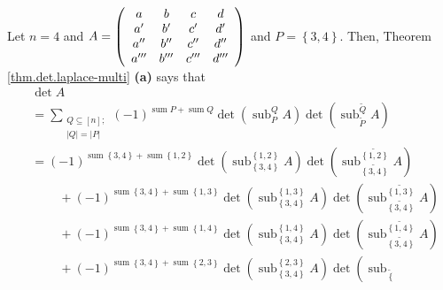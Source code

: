 \begin{example}
Let $n=4$ and $A=\left(
\begin{array}
[c]{cccc}%
a & b & c & d\\
a^{\prime} & b^{\prime} & c^{\prime} & d^{\prime}\\
a^{\prime\prime} & b^{\prime\prime} & c^{\prime\prime} & d^{\prime\prime}\\
a^{\prime\prime\prime} & b^{\prime\prime\prime} & c^{\prime\prime\prime} &
d^{\prime\prime\prime}%
\end{array}
\right)  $ and $P=\left\{  3,4\right\}  $. Then, Theorem
\ref{thm.det.laplace-multi} \textbf{(a)} says that%
\begin{align*}
&  \det A\\
&  =\sum_{\substack{Q\subseteq\left[  n\right]  ;\\\left\vert Q\right\vert
=\left\vert P\right\vert }}\left(  -1\right)  ^{\operatorname*{sum}%
P+\operatorname*{sum}Q}\det\left(  \operatorname*{sub}\nolimits_{P}%
^{Q}A\right)  \det\left(  \operatorname*{sub}\nolimits_{\widetilde{P}%
}^{\widetilde{Q}}A\right) \\
&  =\left(  -1\right)  ^{\operatorname*{sum}\left\{  3,4\right\}
+\operatorname*{sum}\left\{  1,2\right\}  }\det\left(  \operatorname*{sub}%
\nolimits_{\left\{  3,4\right\}  }^{\left\{  1,2\right\}  }A\right)
\det\left(  \operatorname*{sub}\nolimits_{\widetilde{\left\{  3,4\right\}  }%
}^{\widetilde{\left\{  1,2\right\}  }}A\right) \\
&  \ \ \ \ \ \ \ \ \ \ +\left(  -1\right)  ^{\operatorname*{sum}\left\{
3,4\right\}  +\operatorname*{sum}\left\{  1,3\right\}  }\det\left(
\operatorname*{sub}\nolimits_{\left\{  3,4\right\}  }^{\left\{  1,3\right\}
}A\right)  \det\left(  \operatorname*{sub}\nolimits_{\widetilde{\left\{
3,4\right\}  }}^{\widetilde{\left\{  1,3\right\}  }}A\right) \\
&  \ \ \ \ \ \ \ \ \ \ +\left(  -1\right)  ^{\operatorname*{sum}\left\{
3,4\right\}  +\operatorname*{sum}\left\{  1,4\right\}  }\det\left(
\operatorname*{sub}\nolimits_{\left\{  3,4\right\}  }^{\left\{  1,4\right\}
}A\right)  \det\left(  \operatorname*{sub}\nolimits_{\widetilde{\left\{
3,4\right\}  }}^{\widetilde{\left\{  1,4\right\}  }}A\right) \\
&  \ \ \ \ \ \ \ \ \ \ +\left(  -1\right)  ^{\operatorname*{sum}\left\{
3,4\right\}  +\operatorname*{sum}\left\{  2,3\right\}  }\det\left(
\operatorname*{sub}\nolimits_{\left\{  3,4\right\}  }^{\left\{  2,3\right\}
}A\right)  \det\left(  \operatorname*{sub}\nolimits_{\widetilde{\left\{
}}
\end{align*}
\end{example}

